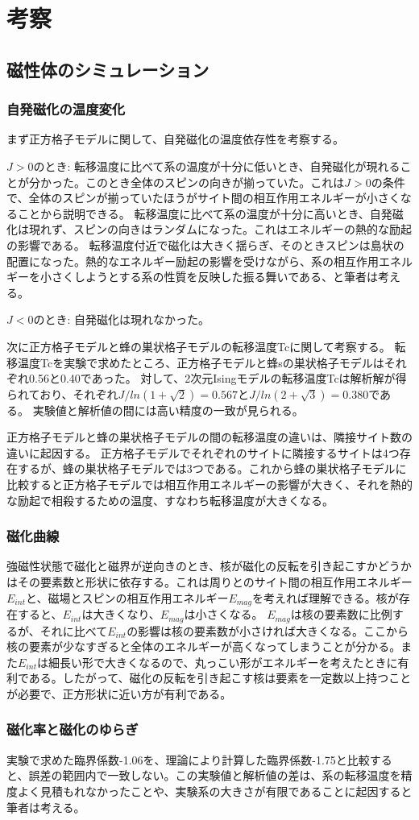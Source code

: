 \documentclass[11pt,a4]{jarticle}
\begin{document}
\section{考察}
\subsection{磁性体のシミュレーション}
\subsubsection{自発磁化の温度変化}
まず正方格子モデルに関して、自発磁化の温度依存性を考察する。

$J>0$のとき: 
転移温度に比べて系の温度が十分に低いとき、自発磁化が現れることが分かった。このとき全体のスピンの向きが揃っていた。これは$J>0$の条件で、全体のスピンが揃っていたほうがサイト間の相互作用エネルギーが小さくなることから説明できる。
転移温度に比べて系の温度が十分に高いとき、自発磁化は現れず、スピンの向きはランダムになった。これはエネルギーの熱的な励起の影響である。
転移温度付近で磁化は大きく揺らぎ、そのときスピンは島状の配置になった。熱的なエネルギー励起の影響を受けながら、系の相互作用エネルギーを小さくしようとする系の性質を反映した振る舞いである、と筆者は考える。

$J<0$のとき: 自発磁化は現れなかった。

次に正方格子モデルと蜂の巣状格子モデルの転移温度Tcに関して考察する。
転移温度Tcを実験で求めたところ、正方格子モデルと蜂sの巣状格子モデルはそれぞれ0.56と0.40であった。
対して、2次元Isingモデルの転移温度Tcは解析解が得られており、それぞれ$J/ln(1+\sqrt{2})=0.567$と$J/ln(2+\sqrt{3})=0.380$である。
実験値と解析値の間には高い精度の一致が見られる。

正方格子モデルと蜂の巣状格子モデルの間の転移温度の違いは、隣接サイト数の違いに起因する。
正方格子モデルでそれぞれのサイトに隣接するサイトは4つ存在するが、蜂の巣状格子モデルでは3つである。これから蜂の巣状格子モデルに比較すると正方格子モデルでは相互作用エネルギーの影響が大きく、それを熱的な励起で相殺するための温度、すなわち転移温度が大きくなる。


\subsubsection{磁化曲線}
強磁性状態で磁化と磁界が逆向きのとき、核が磁化の反転を引き起こすかどうかはその要素数と形状に依存する。これは周りとのサイト間の相互作用エネルギー$E_{int}$と、磁場とスピンの相互作用エネルギー$E_{mag}$を考えれば理解できる。核が存在すると、$E_{int}$は大きくなり、$E_{mag}$は小さくなる。
$E_{mag}$は核の要素数に比例するが、それに比べて$E_{int}$の影響は核の要素数が小さければ大きくなる。ここから核の要素が少なすぎると全体のエネルギーが高くなってしまうことが分かる。また$E_{int}$は細長い形で大きくなるので、丸っこい形がエネルギーを考えたときに有利である。したがって、磁化の反転を引き起こす核は要素を一定数以上持つことが必要で、正方形状に近い方が有利である。

\subsubsection{磁化率と磁化のゆらぎ}
実験で求めた臨界係数-1.06を、理論により計算した臨界係数-1.75と比較すると、誤差の範囲内で一致しない。この実験値と解析値の差は、系の転移温度を精度よく見積もれなかったことや、実験系の大きさが有限であることに起因すると筆者は考える。
\end{document}
